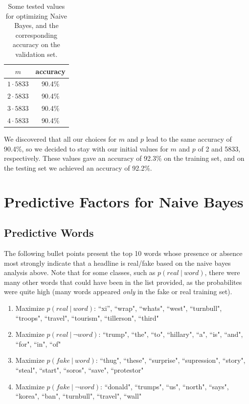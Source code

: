 \documentclass{article}
\renewcommand{\arraystretch}{1.25}
\begin{document}
      \begin{table}[h]
         \centering
         \renewcommand{\arraystretch}{1.5}

         \begin{tabular}{ c|c }
            \hline
            $m$ & accuracy \\
            \hline \hline
            $1 \cdot 5833$ & 90.4\% \\
            $2 \cdot 5833$ &  90.4\% \\
            $3 \cdot 5833$ &  90.4\%  \\
            $4 \cdot 5833$ &  90.4\%  \\
            \hline
         \end{tabular}

         \caption{ Some tested values for optimizing Naive Bayes, and the corresponding accuracy on the
               validation set.}
      \end{table}


   We discovered that all our choices for $m$ and $p$ lead to the same accuracy of 90.4\%, so we decided to stay
   with our initial values for $m$ and $p$ of 2 and 5833, respectively. These values gave an accuracy of 92.3\% on
   the training set, and on the testing set we achieved an accuracy of 92.2\%.


   \section{Predictive Factors for Naive Bayes}
   \subsection{Predictive Words}
   The following bullet points present the top 10 words whose presence or absence most strongly indicate that a headline is real/fake
   based on the naive bayes analysis above. Note that for some classes,
   such as $p(real \ |\ word)$, there were many other words that could have been in the list provided, as the probabilites were quite high
   (many words appeared \textit{only} in the fake or real training set).
   \begin{enumerate}
      \item Maximize $p(real \ |\ word)$:
   	          ``xi'', ``wrap", ``whats", ``west", ``turnbull", ``troops", ``travel", ``tourism", ``tillerson", ``third"
      \item Maximize $p(real \ |\ \neg word)$:
   	         ``trump", ``the", ``to", ``hillary", ``a", ``is", ``and", ``for", ``in", ``of"
      \item Maximize $p(fake \ |\ word)$:
   	         ``thug", ``these", ``surprise", ``supression", ``story", ``steal", ``start", ``soros", ``save", ``protestor"
      \item Maximize $p(fake \ |\ \neg word)$:
   	         ``donald", ``trumps", ``us", ``north", ``says", ``korea", ``ban", ``turnbull", ``travel", ``wall"
   \end{enumerate}
\end{document}
